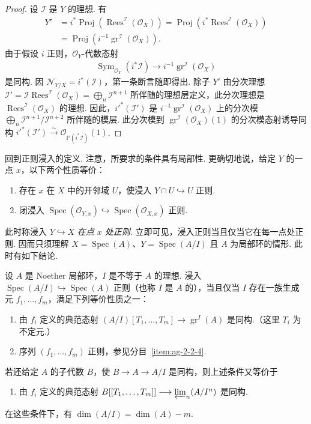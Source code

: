 \begin{proof}
设 $\mathcal I$ 是 $Y$ 的理想. 有
\begin{align*}
Y'&=i^*\operatorname{Proj}(\operatorname{Rees}^{\mathcal I}(\mathcal O_X))
=\operatorname{Proj}(i^*\operatorname{Rees}^{\mathcal I}(\mathcal O_X))\\
&=\operatorname{Proj}(i^{-1}\operatorname{gr}^{\mathcal I}(\mathcal O_X)).
\end{align*}
由于假设 $i$ 正则，$\mathcal O_Y$-代数态射
\begin{align*}
\operatorname{Sym}_{\mathcal O_Y}(i^*\mathcal I)\longrightarrow i^{-1}\operatorname{gr}^{\mathcal I}(\mathcal O_X)
\end{align*}
是同构. 因 $\mathcal N_{Y/X}=i^*(\mathcal I)$，第一条断言随即得出. 除子 $Y'$ 由分次理想 $\mathcal I'=\mathcal I\operatorname{Rees}^{\mathcal I}(\mathcal O_X)=\bigoplus_n\mathcal I^{n+1}$ 所伴随的理想层定义，此分次理想是 $\operatorname{Rees}^{\mathcal I}(\mathcal O_X)$ 的理想. 因此，$i'^*(\mathcal I')$ 是 $i^{-1}\operatorname{gr}^{\mathcal I}(\mathcal O_X)$ 上的分次模 $\bigoplus_n\mathcal I^{n+1}/\mathcal I^{n+2}$ 所伴随的模层. 此分次模到 $\operatorname{gr}^{\mathcal I}(\mathcal O_X)(1)$ 的分次模态射诱导同构 $i'^*(\mathcal I')\xrightarrow\sim\mathcal O_{\mathbb P(i^*\mathcal I)}(1)$.
\end{proof}
回到正则浸入的定义. 注意，所要求的条件具有局部性. 更确切地说，给定 $Y$ 的一点 $x$，以下两个性质等价：
\begin{enumerate}[label=\roman*)]
\item 存在 $x$ 在 $X$ 中的开邻域 $U$，使浸入 $Y\cap U\hookrightarrow U$ 正则.
\item 闭浸入 $\operatorname{Spec}(\mathcal O_{Y,x})\hookrightarrow\operatorname{Spec}(\mathcal O_{X,x})$ 正则.
\end{enumerate}
此时称浸入 $Y\hookrightarrow X$ \emph{在点 $x$ 处正则}. 立即可见，浸入正则当且仅当它在每一点处正则. 因而只须理解 $X=\operatorname{Spec}(A)$、$Y=\operatorname{Spec}(A/I)$ 且 $A$ 为局部环的情形. 此时有如下结论.
\begin{proposition}\label{item:ag-3-1-8}
设 $A$ 是 Noether 局部环，$I$ 是不等于 $A$ 的理想. 浸入 $\operatorname{Spec}(A/I)\hookrightarrow\operatorname{Spec}(A)$ 正则（也称 $I$ 是 $A$ 的），当且仅当 $I$ 存在一族生成元 $f_1,\ldots,f_m$，满足下列等价性质之一：
\begin{enumerate}[label=\roman*)]
\item 由 $f_i$ 定义的典范态射 $(A/I)[T_1,\ldots,T_m]\longrightarrow\operatorname{gr}^{I}(A)$ 是同构.（这里 $T_i$ 为不定元.）
\item 序列 $(f_1,\ldots,f_m)$ 正则，参见分目~\ref{item:ag-2-2-4}.
\end{enumerate}
若还给定 $A$ 的子代数 $B$，使 $B\longrightarrow A\longrightarrow A/I$ 是同构，则上述条件又等价于
\begin{enumerate}[label=\roman*),start=3]
\item 由 $f_i$ 定义的典范态射 $B[[T_1,\ldots,T_m]]\longrightarrow\varprojlim_n(A/I^n)$ 是同构.
\end{enumerate}
在这些条件下，有 $\dim(A/I)=\dim(A)-m$.
\end{proposition}
